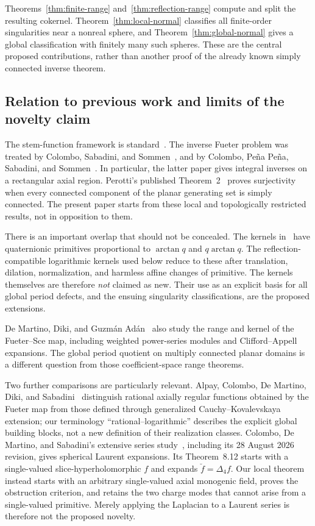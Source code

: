 \documentclass[11pt,a4paper]{article}
\numberwithin{equation}{section}
\theoremstyle{definition}
\theoremstyle{remark}
\newcommand{\Lap}{\Delta_4}
\begin{document}
Theorems~\ref{thm:finite-range} and~\ref{thm:reflection-range} compute and
split the resulting cokernel. Theorem~\ref{thm:local-normal} classifies all
finite-order singularities near a nonreal sphere, and
Theorem~\ref{thm:global-normal} gives a global classification with finitely
many such spheres. These are the central proposed contributions, rather
than another proof of the already known simply connected inverse theorem.

\subsection{Relation to previous work and limits of the novelty claim}
The stem-function framework is standard~\cite{GP}. The inverse Fueter
problem was treated by Colombo, Sabadini, and Sommen~\cite{CSS}, and by
Colombo, Pe\~na Pe\~na, Sabadini, and Sommen~\cite{CPSS}. In particular, the
latter paper gives integral inverses on a rectangular axial region.
Perotti's published Theorem~2~\cite{Perotti} proves surjectivity when every
connected component of the planar generating set is simply connected.
The present paper starts from these local and topologically restricted
results, not in opposition to them.

There is an important overlap that should not be concealed. The kernels
in~\cite[Section~5]{CSS} have quaternionic primitives proportional to
$\arctan q$ and $q\arctan q$. The reflection-compatible logarithmic kernels
used below reduce to these after translation, dilation, normalization,
and harmless affine changes of primitive. The kernels themselves are
therefore \emph{not} claimed as new. Their use as an explicit basis for
all global period defects, and the ensuing singularity classifications,
are the proposed extensions.

De Martino, Diki, and Guzm\'an Ad\'an~\cite{DDG} also study the range and
kernel of the Fueter--Sce map, including weighted power-series modules and
Clifford--Appell expansions. The global period quotient on multiply
connected planar domains is a different question from those
coefficient-space range theorems.

Two further comparisons are particularly relevant. Alpay, Colombo,
De Martino, Diki, and Sabadini~\cite{Rational} distinguish rational
axially regular functions obtained by the Fueter map from those defined
through generalized Cauchy--Kovalevskaya extension; our terminology
``rational--logarithmic'' describes the explicit global building blocks,
not a new definition of their realization classes. Colombo, De Martino,
and Sabadini's extensive series study~\cite{Laurent2026}, including its
28 August 2026 revision, gives spherical Laurent expansions. Its
Theorem~8.12 starts with a single-valued slice-hyperholomorphic $f$ and
expands $\breve f=\Lap f$. Our local theorem instead starts with an
arbitrary single-valued axial monogenic field, proves the obstruction
criterion, and retains the two charge modes that cannot arise from a
single-valued primitive. Merely applying the Laplacian to a Laurent
series is therefore not the proposed novelty.
\end{document}
